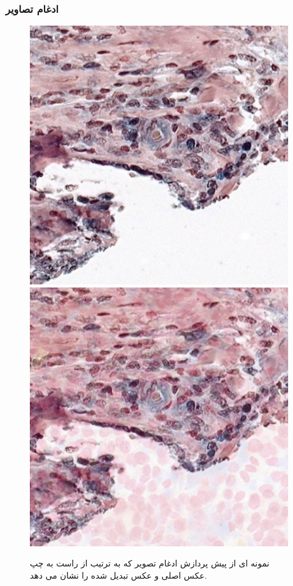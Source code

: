 \subsubsection{ادغام تصاویر}
\begin{figure}
    \begin{center}
        \includegraphics[width=0.48\linewidth]{figs/suggested_methods/subs/data_augmentation/mixup_776-original.jpeg}
        \includegraphics[width=0.48\linewidth]{figs/suggested_methods/subs/data_augmentation/mixup_776-transformed.jpeg}
    \end{center}
    \caption{نمونه ای از پیش پردازش ادغام تصویر که به ترتیب از راست به چپ عکس اصلی و عکس تبدیل شده را نشان می دهد.}
    \label{شکل: mixup augmentation}
\end{figure}
